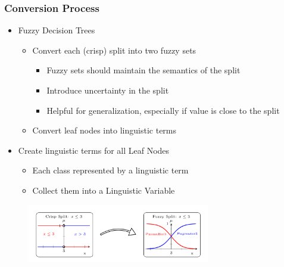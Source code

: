 \documentclass[
	10pt,
	t		%
]{beamer}
\begin{document}
\begin{frame}
	\frametitle{Conversion Process}

	\begin{itemize}
		\item Fuzzy Decision Trees
		      \begin{itemize}
			      \item Convert each (crisp) split into two fuzzy sets
			            \begin{itemize}
				            \item Fuzzy sets should maintain the semantics of the split
				            \item Introduce uncertainty in the split
				            \item Helpful for generalization, especially if value is close to the split
			            \end{itemize}
			      \item Convert leaf nodes into linguistic terms
		      \end{itemize}
		\item Create linguistic terms for all Leaf Nodes
		      \begin{itemize}
			      \item Each class represented by a linguistic term
			      \item Collect them into a Linguistic Variable
		      \end{itemize}
	\end{itemize}



	\begin{figure}
		\centering
		\includegraphics[width=8cm]{figures/leaf-conversion.png}

	\end{figure}





\end{frame}
\end{document}
